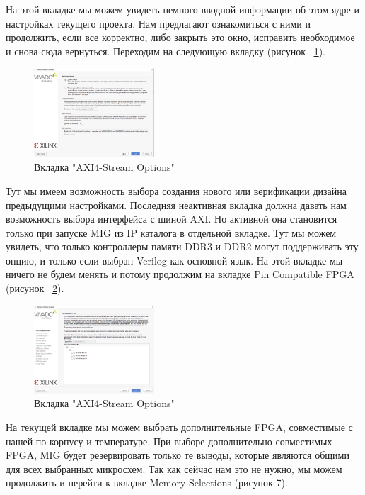 \documentclass[a4paper,oneside ,14pt]{extreport}
\begin{document}
На этой вкладке мы можем увидеть немного вводной информации об этом ядре и настройках текущего проекта. Нам предлагают ознакомиться с ними и продолжить, если все корректно, либо закрыть это окно, исправить необходимое и снова сюда вернуться. Переходим на следующую вкладку (рисунок ~\ref{mig_1}).

\begin{figure}[h]
	\centering
	\includegraphics[width=0.4\textwidth]{image/mig_1.png}
	\caption{Вкладка "AXI4-Stream Options"}
	\label{mig_1}
\end{figure}

Тут мы имеем возможность выбора создания нового или верификации дизайна предыдущими настройками. Последняя неактивная вкладка должна давать нам возможность выбора интерфейса с шиной AXI. Но активной она становится только при запуске MIG из IP каталога в отдельной вкладке. Тут мы можем увидеть, что только контроллеры памяти DDR3 и DDR2 могут поддерживать эту опцию, и только если выбран Verilog как основной язык. На этой вкладке мы ничего не будем менять и потому продолжим на вкладке Pin Compatible FPGA (рисунок ~\ref{mig_2}).

\begin{figure}[h]
	\centering
	\includegraphics[width=0.4\textwidth]{image/mig_2.png}
	\caption{Вкладка "AXI4-Stream Options"}
	\label{mig_2}
\end{figure}

На текущей вкладке мы можем выбрать дополнительные FPGA, совместимые с нашей по корпусу и температуре. При выборе дополнительно совместимых FPGA, MIG будет резервировать только те выводы, которые являются общими для всех выбранных микросхем. Так как сейчас нам это не нужно, мы можем продолжить и перейти к вкладке Memory Selections (рисунок 7).
\end{document}
